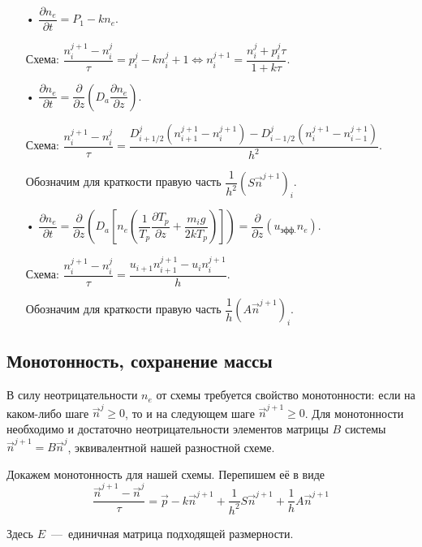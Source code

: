 \documentclass[12pt, a5paper, fleqn, twoside]{article}
\theoremstyle{definiton}
\theoremstyle{definition}
\let\geq\geqslant
\begin{document}
\begin{itemize}

\item[•] $\dfrac{\partial n_e}{\partial t}=P_1-kn_e.$

Схема: $\dfrac{n_i^{j+1}-n_i^j}{\tau}=p_i^j-kn_i^j+1\Leftrightarrow n_i^{j+1} = \dfrac{n_i^j+p_i^j\tau}{1+k\tau}.$

\bigskip

\item[•] $\dfrac{\partial n_e}{\partial t}=\dfrac{\partial}{\partial z}\left(D_a\dfrac{\partial n_e}{\partial z}\right).$

Схема: $\dfrac{n_i^{j+1}-n_i^j}{\tau} = \dfrac{D_{i+1/2}^j(n_{i+1}^{j+1}-n_i^{j+1})-D_{i-1/2}^j(n_{i}^{j+1}-n_{i-1}^{j+1})}{h^2}$. 

Обозначим для краткости правую часть $\dfrac{1}{h^2}(S\vec{n}^{j+1})_i$.

\bigskip

\item[•] $\dfrac{\partial n_e}{\partial t}=\dfrac{\partial}{\partial z}\left(D_a\left[n_e\left(\dfrac{1}{T_p}\dfrac{\partial T_p}{\partial z}+\dfrac{m_ig}{2kT_p}\right)\right]\right)=\dfrac{\partial}{\partial z}(u_\textrm{эфф.}n_e)$.

Схема: $\dfrac{n_i^{j+1}-n_i^j}{\tau} = \dfrac{u_{i+1}n_{i+1}^{j+1}-u_i n_i^{j+1}}{h}$.

Обозначим для краткости правую часть $\dfrac{1}{h}(A\vec{n}^{j+1})_i$.

\end{itemize}

\subsection*{Монотонность, сохранение массы}

В силу неотрицательности $n_e$ от схемы требуется свойство монотонности: если на каком-либо шаге $\vec{n}^j \geq 0$, то и на следующем шаге $\vec{n}^{j+1}\geq 0$. Для монотонности необходимо и достаточно неотрицательности элементов матрицы $B$ системы $\vec{n}^{j+1}=B\vec{n}^j$, эквивалентной нашей разностной схеме.

\smallskip

Докажем монотонность для нашей схемы. Перепишем её в виде $$\dfrac{\vec{n}^{j+1}-\vec{n}^j}{\tau}= \vec{p} - k\vec{n}^{j+1}+\dfrac{1}{h^2}S\vec{n}^{j+1}+\dfrac{1}{h}A\vec{n}^{j+1}$$

Здесь $E$~---~единичная матрица подходящей размерности.
\end{document}
